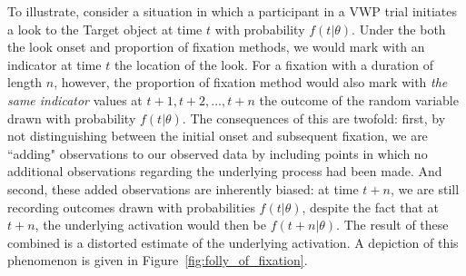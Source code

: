 \documentclass{article}
\begin{document}
To illustrate, consider a situation in which a participant in a VWP trial initiates a look to the Target object at time $t$ with probability $f(t|\theta)$. Under the both the look onset and proportion of fixation methods, we would mark with an indicator at time $t$ the location of the look. For a fixation with a duration of length $n$, however, the proportion of fixation method would also mark with \textit{the same indicator} values at $t+1, t+2, \dots, t+n$ the outcome of the random variable drawn with probability $f(t|\theta)$. The consequences of this are twofold: first, by not distinguishing between the initial onset and subsequent fixation, we are ``adding" observations to our observed data by including points in which no additional observations regarding the underlying process had been made. And second, these added observations are inherently biased: at time $t+n$, we are still recording outcomes drawn with probabilities $f(t|\theta)$, despite the fact that at $t+n$, the underlying activation would then be $f(t+n | \theta)$. The result of these combined is a distorted  estimate of the underlying activation. A depiction of this phenomenon is given in Figure~\ref{fig:folly_of_fixation}.
\end{document}
